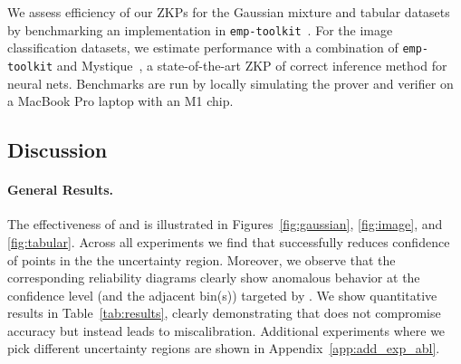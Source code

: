  We assess efficiency of our ZKPs for the Gaussian mixture and tabular datasets by benchmarking an implementation in \texttt{emp-toolkit}~\cite{emp-toolkit}. For the image classification datasets, we estimate performance with a combination of \texttt{emp-toolkit} and Mystique~\cite{weng2021mystique}, a state-of-the-art ZKP of correct inference method for neural nets. Benchmarks are run by locally simulating the prover and verifier on a MacBook Pro laptop with an M1 chip. %


\subsection{Discussion}

\paragraph{General Results.}

The effectiveness of \attack and \name is illustrated in Figures~\ref{fig:gaussian}, \ref{fig:image}, and \ref{fig:tabular}. Across all experiments we find that \attack successfully reduces confidence of points in the the uncertainty region. Moreover, we observe that the corresponding reliability diagrams clearly show anomalous behavior at the confidence level (and the adjacent bin(s)) targeted by \attack. We show quantitative results in Table~\ref{tab:results}, clearly demonstrating that \attack does not compromise accuracy but instead leads to miscalibration. Additional experiments where we pick different uncertainty regions are shown in Appendix~\ref{app:add_exp_abl}. %

